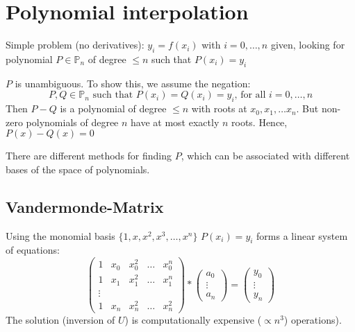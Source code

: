 \section{Polynomial interpolation}\label{sec:polynomial-interpolation}
Simple problem (no derivatives): $y_i = f(x_i)$ with $i = 0, \ldots, n$ given,
looking for polynomial $P \in \mathbb{P}_n$ of degree $\leq n$ such that
$P(x_i) = y_i$

$P$ is unambiguous.
To show this, we assume the negation:
\begin{equation*}
    P, Q \in \mathbb{P}_n \text{ such that } P(x_i)=Q(x_i)=y_i\text{, for all } i = 0, \ldots, n
\end{equation*}
Then $P-Q$ is a polynomial of degree $\leq n$ with roots at
$x_0, x_1, \ldots x_n$.
But non-zero polynomials of degree $n$ have at most
exactly $n$ roots.
Hence, $P(x)-Q(x) = 0$

There are different methods for finding $P$, which can be associated with different
bases of the space of polynomials.

\subsection{Vandermonde-Matrix}\label{subsec:vandermond-matrix}
Using the monomial basis $\{ 1, x, x^2, x^3, \ldots, x^n\}$ $P(x_i) = y_i$ forms a
linear system of equations:
\begin{equation*}
    \begin{pmatrix*}
        1 &x_0 &x_0^2 &\ldots & x_0^n\\
        1 &x_1 &x_1^2 &\ldots & x_1^n\\
        \vdots \\
        1 & x_n & x_n^2&\ldots  &x_n^2
    \end{pmatrix*}
    *
    \begin{pmatrix*}
        a_0 \\
        \vdots\\
        a_n
    \end{pmatrix*}
    =
    \begin{pmatrix*}
        y_0\\
        \vdots\\
        y_n
    \end{pmatrix*}
\end{equation*}
The solution (inversion of $U$) is computationally expensive ($\propto n^3$) operations).


